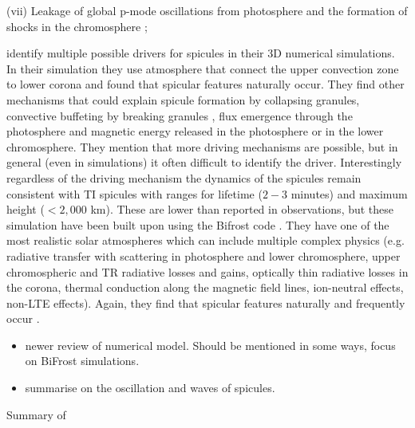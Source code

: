 \documentclass[12pt]{ociamthesis}
\begin{document}
(vii) Leakage of global p-mode oscillations from photosphere and the formation of shocks in the chromosphere \cite{Pontieu2004Natur,Zaqarashvili2007A&A}; 

 \cite{Mart2009ApJ7011569M} identify multiple possible drivers for spicules in their 3D numerical simulations. In their simulation they use atmosphere that connect the upper convection zone to lower corona and found that spicular features naturally occur. They find other mechanisms that could explain spicule formation by collapsing granules, convective buffeting by breaking granules \citep{Roberts1979SoPh6123R}, flux emergence through the photosphere and magnetic energy released in the photosphere or in the lower chromosphere. They mention that more driving mechanisms are possible, but in general (even in simulations) it often difficult to identify the driver. Interestingly regardless of the driving mechanism the dynamics of the spicules remain consistent with TI spicules with ranges for lifetime ($2-3$ minutes) and maximum height ($<2,000$ km). These are lower than reported in observations, but these simulation have been built upon \citep{Mart2017Sci3561269M,Mart2018ApJ860116M,Mart2020ApJ88995M} using the Bifrost code \citep{Gudiksen2011AA531A154G}. They have one of the most realistic solar atmospheres which can include multiple complex physics (e.g. radiative transfer with scattering in photosphere and lower chromosphere, upper chromospheric and TR radiative losses and gains, optically thin radiative losses in the corona, thermal conduction along the magnetic field lines, ion-neutral effects, non-LTE effects). Again, they find that spicular features naturally and frequently occur \citep{Mart2017Sci3561269M}.
\begin{itemize}
\item \cite{Carlsson2019ARAA57189C} newer review of numerical model. Should be mentioned in some ways, focus on BiFrost simulations.
\item \cite{Zaqarashvili_2009SSRv} summarise on the oscillation and waves of spicules.
\end{itemize}
Summary of \cite{Sterling_2000SoPh}
\end{document}
